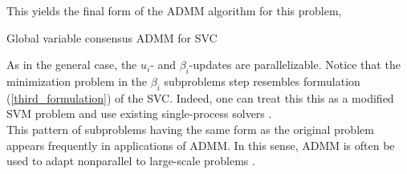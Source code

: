 \documentclass[11pt]{article}
\begin{document}
This yields the final form of the ADMM algorithm for this problem, \\

\begin{algorithm}[H]
    \caption{Global variable consensus ADMM for SVC}

    \SetAlgoNoLine

\end{algorithm}
\vspace{5pt}
As in the general case, the $u_i$- and $\beta_i$-updates are parallelizable. Notice 
that the minimization problem in the $\beta_i$ subproblems step resembles formulation (\ref{third_formulation}) of the SVC. Indeed, one can treat this this as a modified SVM problem and 
use existing single-process solvers \cite{boydistributed}. \\
This pattern of subproblems having the same form as the original problem appears frequently in 
applications of ADMM. In this sense, ADMM is often be used to adapt nonparallel to large-scale problems \cite{boydistributed}.



\end{document}
